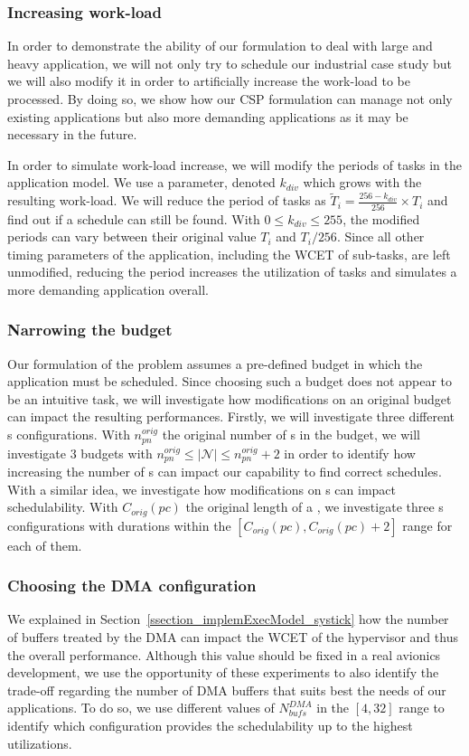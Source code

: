 \documentclass[main.tex]{subfiles}
\begin{document}
\subsubsection{Increasing work-load}
In order to demonstrate the ability of our formulation to deal with large and
heavy application, we will not only try to schedule our industrial case study
but we will also modify it in order to artificially increase the work-load to
be processed. By doing so, we show how our CSP formulation can manage not only
existing applications but also more demanding applications as it may be
necessary in the future. 

In order to simulate work-load increase, we will modify the periods of tasks in
the application model. We use a parameter, denoted $k_{div}$ which grows with
the resulting work-load. We will reduce the period of tasks as $\widetilde{T}_i
= \frac{256-k_{div}}{256} \times T_i$ and find out if a schedule can still be
found. With $0 \leq k_{div} \leq 255$, the modified periods can vary between
their original value $T_i$ and $T_i / 256$. Since all other timing parameters
of the application, including the WCET of sub-tasks, are left unmodified,
reducing the period increases the utilization of tasks and simulates a more
demanding application overall. 

\subsubsection{Narrowing the budget}
\label{sssec_validation_expGoalNarrowBudget}
Our formulation of the problem assumes a pre-defined budget in which the
application must be scheduled. Since choosing such a budget does not appear to
be an intuitive task, we will investigate how modifications on an original
budget can impact the resulting performances. Firstly, we will investigate
three different \PN{}s configurations. With $n_{pn}^{orig}$ the original number
of \PN{}s in the budget, we will investigate 3 budgets with $ n_{pn}^{orig}
\leq |\mathcal{N}| \leq n_{pn}^{orig} + 2$ in order to identify how increasing
the number of \PN{}s can impact our capability to find correct schedules. With
a similar idea, we investigate how modifications on \PC{}s can impact
schedulability. With $C_{orig}(pc)$ the original length of a \PC{}, we
investigate three \PC{}s configurations with durations within the $[
    C_{orig}(pc) , C_{orig}(pc) +2 ]$ range for each of them.

\subsubsection{Choosing the DMA configuration}
We explained in Section~\ref{ssection_implemExecModel_systick} how the number
of buffers treated by the DMA can impact the WCET of the hypervisor and thus
the overall performance. Although this value should be fixed in a real avionics
development, we use the opportunity of these experiments to also identify the
trade-off regarding the number of DMA buffers that suits best the needs of our
applications. To do so, we use different values of $N_{bufs}^{DMA}$ in the
$[4,32]$ range to identify which configuration provides the schedulability up
to the highest utilizations.
\end{document}
